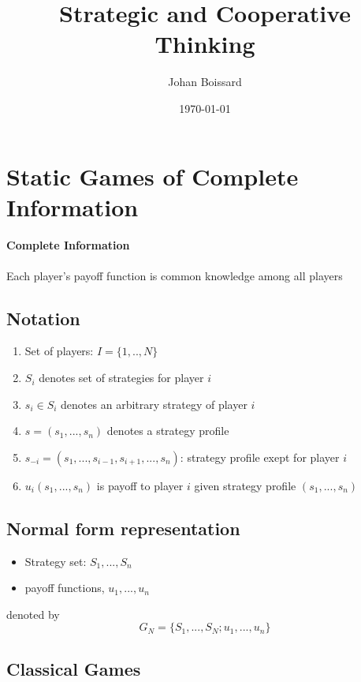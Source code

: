\documentclass[a4paper] {scrartcl}
\author{Johan Boissard}
\date{\today}
\title{Strategic and Cooperative Thinking}
\begin{document}
\maketitle

\section{Static Games of Complete Information}

\paragraph{Complete Information} %
\label{par:complete_information}
Each player's payoff function is common knowledge among all players


\subsection{Notation}
\begin{enumerate}
	\item Set of players: $I=\{1,..,N\}$
	\item $S_i$ denotes set of strategies for player $i$
	\item $s_i\in S_i$ denotes an arbitrary strategy of player $i$
	\item $s=(s_1, ..., s_n)$ denotes a strategy profile
	\item $s_{-i}=(s_1, ..., s_{i-1}, s_{i+1}, ..., s_n)$: strategy profile exept for player  $i$
	\item $u_i(s_1, ..., s_n)$ is payoff to player $i$ given strategy profile $(s_1, ..., s_n)$
\end{enumerate}

\subsection{Normal form representation}
\begin{itemize}
	\item Strategy set: $S_1, ..., S_n$
	\item payoff functions, $u_1, ..., u_n$
\end{itemize}
denoted by
\begin{equation}
	G_N = \{S_1, ..., S_N;u_1, ..., u_n\}
\end{equation}

\subsection{Classical Games}
\end{document}
